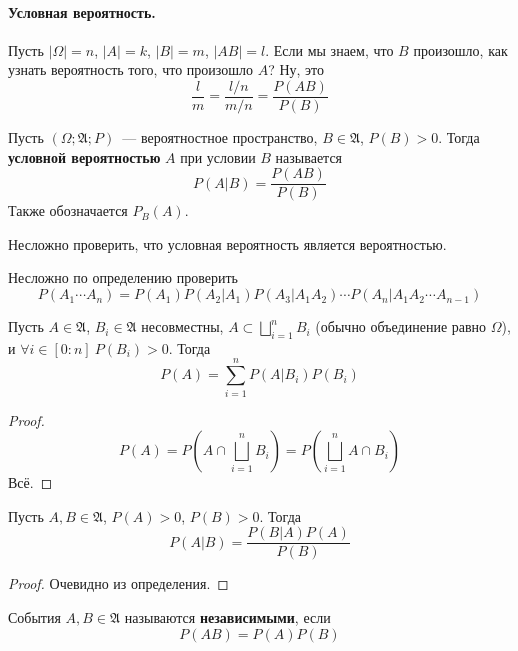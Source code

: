 \documentclass{article}
\newcommand{\A}{{\mathfrak A}}
\begin{document}
    \paragraph{Условная вероятность.}
    \begin{remark}
        Пусть $|\Omega|=n$, $|A|=k$, $|B|=m$, $|AB|=l$. Если мы знаем, что $B$ произошло, как узнать вероятность того, что произошло $A$? Ну, это
        $$
        \frac lm=\frac{l/n}{m/n}=\frac{P(AB)}{P(B)}
        $$
    \end{remark}
    \begin{definition}
        Пусть $(\Omega;\A;P)$~--- вероятностное пространство, $B\in\A$, $P(B)>0$. Тогда \textbf{условной вероятностью} $A$ при условии $B$ называется
        $$
        P(A|B)=\frac{P(AB)}{P(B)}
        $$
        Также обозначается $P_B(A)$.
    \end{definition}
    \begin{property}
        Несложно проверить, что условная вероятность является вероятностью.
    \end{property}
    \begin{claim}
        Несложно по определению проверить
        $$
        P(A_1\cdots A_n)=P(A_1)P(A_2|A_1)P(A_3|A_1A_2)\cdots P(A_n|A_1A_2\cdots A_{n-1})
        $$
    \end{claim}
    \begin{theorem}
        Пусть $A\in\A$, $B_i\in\A$ несовместны, $A\subset\bigsqcup\limits_{i=1}^nB_i$ (обычно объединение равно $\Omega$), и $\forall i\in[0:n]~P(B_i)>0$. Тогда
        $$
        P(A)=\sum\limits_{i=1}^nP(A|B_i)P(B_i)
        $$
    \end{theorem}
    \begin{proof}
        $$
        P(A)=P\left(A\cap\bigsqcup\limits_{i=1}^nB_i\right)=P\left(\bigsqcup\limits_{i=1}^nA\cap B_i\right)
        $$
        Всё.
    \end{proof}
    \begin{theorem}
        Пусть $A,B\in\A$, $P(A)>0$, $P(B)>0$. Тогда
        $$
        P(A|B)=\frac{P(B|A)P(A)}{P(B)}
        $$
    \end{theorem}
    \begin{proof}
        Очевидно из определения.
    \end{proof}
    \begin{definition}
        События $A,B\in\A$ называются \textbf{независимыми}, если
        $$
        P(AB)=P(A)P(B)
        $$
    \end{definition}
\end{document}
